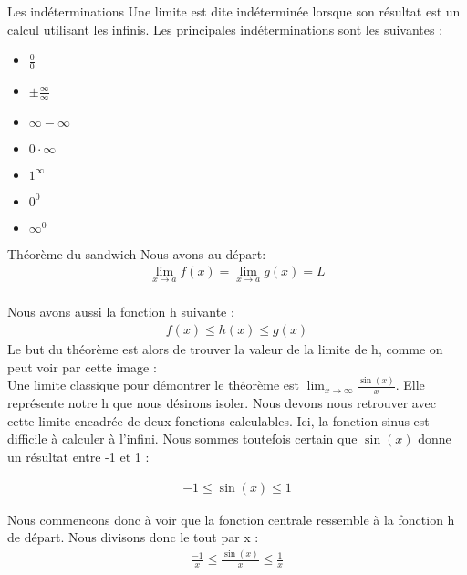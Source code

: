 \documentclass[10pt, french]{article}
\begin{document}
\begin{multicols*}{2}
\begin{rappel}{Les indéterminations}
  Une limite est dite indéterminée lorsque son résultat est un calcul utilisant les infinis. Les principales indéterminations sont les suivantes :
  \begin{itemize}
    \item $\frac{0}{0}$
    \item $\pm \frac{\infty}{\infty}$
    \item $\infty - \infty$
    \item $0 \cdot \infty$
    \item $1^{\infty}$
    \item $0^{0}$
    \item $\infty^{0}$
  \end{itemize}
\end{rappel}

\begin{rappel}{Théorème du sandwich}
Nous avons au départ:
  \begin{align*}
  \lim_{x \to a}  f(x) = \lim_{x \to a} g(x) = L
  \end{align*}
\\Nous avons aussi la fonction h suivante :
  \begin{align*}
    f(x) \leq h(x) \leq g(x)
  \end{align*}
  Le but du théorème est alors de trouver la valeur de la limite de h, comme on peut voir par cette image :\\
Une limite classique pour démontrer le théorème est $\lim_{x \to \infty} \frac{\sin(x)}{x}$. Elle représente notre h que nous désirons isoler. Nous devons nous retrouver avec cette limite encadrée de deux fonctions calculables. Ici, la fonction sinus est difficile à calculer à l'infini. Nous sommes toutefois certain que $\sin(x)$ donne un résultat entre -1 et 1 :

  \begin{align*}
    -1 \leq \sin(x) \leq 1
  \end{align*}

Nous commencons donc à voir que la fonction centrale ressemble à la fonction h de départ. Nous divisons donc le tout par x :
\begin{align*}
    \frac{-1}{x} \leq \frac{\sin(x)}{x} \leq \frac{1}{x}
  \end{align*}


\end{rappel}
\end{multicols*}
\end{document}
